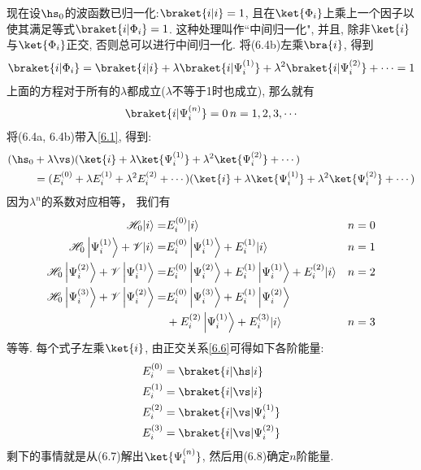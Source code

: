 现在设$\hs_0$的波函数已归一化:$\braket{i|i}=1$, 
且在$\ket{\Phi_i}$上乘上一个因子以使其满足等式$\braket{i|\Phi_i}=1$. 
这种处理叫作``中间归一化", 
并且, 
除非$\ket{i}$与$\ket{\Phi_i}$正交, 
否则总可以进行中间归一化. 
将(6.4b)左乘$\bra{i}$, 
得到
\begin{align}
\braket{i|\Phi_i}=\braket{i|i}+\lambda\braket{i|\Psi_i^{(1)}}+\lambda^2\braket{i|\Psi_i^{(2)}} + \cdots = 1
\end{align}
上面的方程对于所有的$\lambda$都成立($\lambda$不等于1时也成立), 
那么就有
\begin{align}
\braket{i|\Psi_i^{(n)}} = 0\, \hfill n=1,2,3,\cdots
\label{6.6}
\end{align}
将(6.4a,
6.4b)带入\autoref{6.1}, 
得到:
\begin{align*}
(\hs_0&+\lambda\vs)(\ket{i}+\lambda\ket{\Psi_i^{(1)}} + \lambda^2 \ket{\Psi_i^{(2)}} +\cdots )\\
&=(E_i^{(0)} + \lambda E_i^{(1)} + \lambda^2 E_i^{(2)}  + \cdots )(\ket{i}+\lambda\ket{\Psi_i^{(1)}} + \lambda^2 \ket{\Psi_i^{(2)}} +\cdots)
\end{align*}
因为$\lambda^n$的系数对应相等，
我们有
\begin{subequations}
	\begin{align}
		\mathscr{H}_0|i\rangle=& E_i^{(0)}|i\rangle & & n=0 \\
		\mathscr{H}_0\left|\Psi_i^{(1)}\right\rangle+\mathscr{V}|i\rangle=& E_i^{(0)}\left|\Psi_i^{(1)}\right\rangle+E_i^{(1)}|i\rangle & & n=1 \\
		\mathscr{H}_0\left|\Psi_i^{(2)}\right\rangle+\mathscr{V}\left|\Psi_i^{(1)}\right\rangle=& E_i^{(0)}\left|\Psi_i^{(2)}\right\rangle+E_i^{(1)}\left|\Psi_i^{(1)}\right\rangle+E_i^{(2)}|i\rangle & & n=2 \\
		\mathscr{H}_0\left|\Psi_i^{(3)}\right\rangle+\mathscr{V}\left|\Psi_i^{(2)}\right\rangle=& E_i^{(0)}\left|\Psi_i^{(3)}\right\rangle+E_i^{(1)}\left|\Psi_i^{(2)}\right\rangle & \notag \\
		&+E_i^{(2)}\left|\Psi_i^{(1)}\right\rangle+E_i^{(3)}|i\rangle & & n=3
	\end{align}
\end{subequations}
等等. 
每个式子左乘$\ket{i}$, 
由正交关系\autoref{6.6}可得如下各阶能量:
\begin{subequations}
\begin{align}
E_i^{(0)} &= \braket{i|\hs|i} \\
E_i^{(1)} &= \braket{i|\vs|i} \\
E_i^{(2)} &= \braket{i|\vs|\Psi_i^{(1)}} \\
E_i^{(3)} &= \braket{i|\vs|\Psi_i^{(2)}}
\end{align}
\end{subequations}
剩下的事情就是从(6.7)解出$\ket{\Psi_i^{(n)}}$, 
然后用(6.8)确定$n$阶能量.


